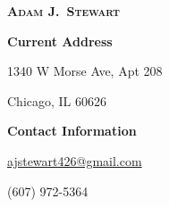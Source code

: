 
\begin{center}

    \textbf{\textsc{\Large Adam J.\ Stewart}}

\end{center}

\vspace{-12pt}

\begin{multicols}{2}

    \begin{flushleft}

        \textbf{Current Address}

        1340 W Morse Ave, Apt 208

        Chicago, IL 60626

    \end{flushleft}

    \columnbreak

    \begin{flushright}

        \textbf{Contact Information}

        \href{mailto:ajstewart426@gmail.com}{ajstewart426@gmail.com}

        (607) 972-5364

    \end{flushright}

\end{multicols}

